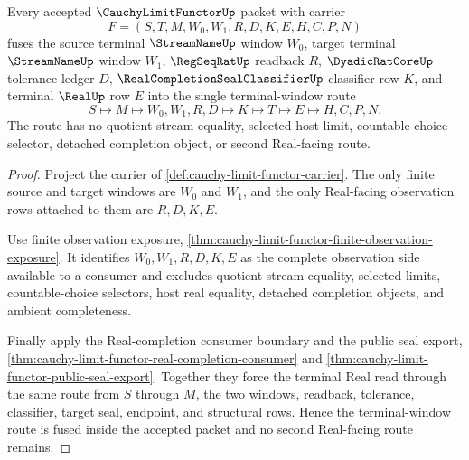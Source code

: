 \begin{theorem}
\label{thm:cauchy-limit-functor-terminal-window-fusion}
Every accepted $\CauchyLimitFunctorUp$ packet with carrier
$$
F=(S,T,M,W_0,W_1,R,D,K,E,H,C,P,N)
$$
fuses the source terminal $\StreamNameUp$ window $W_0$, target terminal $\StreamNameUp$ window $W_1$, $\RegSeqRatUp$ readback $R$, $\DyadicRatCoreUp$ tolerance ledger $D$, $\RealCompletionSealClassifierUp$ classifier row $K$, and terminal $\RealUp$ row $E$ into the single terminal-window route
$$
S \longmapsto M \longmapsto W_0,W_1,R,D \longmapsto K \longmapsto T \longmapsto E \longmapsto H,C,P,N.
$$
The route has no quotient stream equality, selected host limit, countable-choice selector, detached completion object, or second Real-facing route.
\end{theorem}
\begin{proof}
Project the carrier of \autoref{def:cauchy-limit-functor-carrier}. The only finite source and target windows are $W_0$ and $W_1$, and the only Real-facing observation rows attached to them are $R,D,K,E$.

Use finite observation exposure, \autoref{thm:cauchy-limit-functor-finite-observation-exposure}. It identifies $W_0,W_1,R,D,K,E$ as the complete observation side available to a consumer and excludes quotient stream equality, selected limits, countable-choice selectors, host real equality, detached completion objects, and ambient completeness.

Finally apply the Real-completion consumer boundary and the public seal export, \autoref{thm:cauchy-limit-functor-real-completion-consumer} and \autoref{thm:cauchy-limit-functor-public-seal-export}. Together they force the terminal Real read through the same route from $S$ through $M$, the two windows, readback, tolerance, classifier, target seal, endpoint, and structural rows. Hence the terminal-window route is fused inside the accepted packet and no second Real-facing route remains.
\end{proof}

